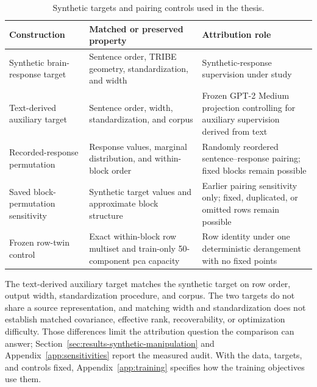 \begin{table}[tbp]
  \centering
  \small
  \caption{Synthetic targets and pairing controls used in the thesis.}
  \label{tab:appendix-target-controls}
  \begin{tabularx}{\textwidth}{@{}>{\raggedright\arraybackslash}p{}>{\raggedright\arraybackslash}X>{\raggedright\arraybackslash}X@{}}
    \toprule
    Construction & Matched or preserved property & Attribution role \\
    \midrule
    Synthetic brain-response target & Sentence order, TRIBE geometry, standardization, and width & Synthetic-response supervision under study \\
    \midrule
    Text-derived auxiliary target & Sentence order, width, standardization, and corpus & Frozen GPT-2 Medium projection controlling for auxiliary supervision derived from text \\
    \midrule
    Recorded-response permutation & Response values, marginal distribution, and within-block order & Randomly reordered sentence--response pairing; fixed blocks remain possible \\
    \midrule
    Saved block-permutation sensitivity & Synthetic target values and approximate block structure & Earlier pairing sensitivity only; fixed, duplicated, or omitted rows remain possible \\
    \midrule
    Frozen row-twin control & Exact within-block row multiset and train-only 50-component \ac{pca} capacity & Row identity under one deterministic derangement with no fixed points \\
    \bottomrule
  \end{tabularx}
\end{table}

The text-derived auxiliary target matches the synthetic target on row order, output width, standardization procedure, and corpus.
The two targets do not share a source representation, and matching width and standardization does not establish matched covariance, effective rank, recoverability, or optimization difficulty.
Those differences limit the attribution question the comparison can answer; Section~\ref{sec:results-synthetic-manipulation} and Appendix~\ref{app:sensitivities} report the measured audit.
With the data, targets, and controls fixed, Appendix~\ref{app:training} specifies how the training objectives use them.
